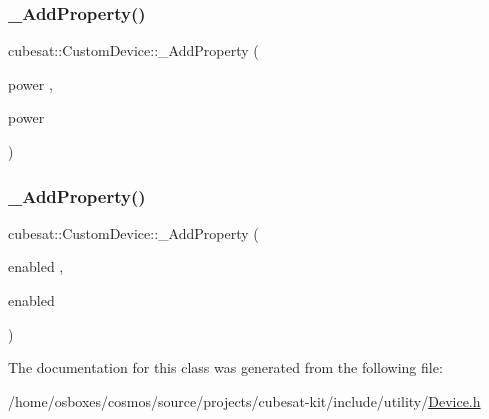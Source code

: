 \mbox{\label{classcubesat_1_1CustomDevice_a08d07a6fd08acc7064301ea4d9f927a3}} 
\subsubsection{\texorpdfstring{\+\_\+\+Add\+Property()}{\_AddProperty()}\hspace{0.1cm}{\footnotesize\ttfamily [5/6]}}
{\footnotesize\ttfamily cubesat\+::\+Custom\+Device\+::\+\_\+\+Add\+Property (\begin{DoxyParamCaption}\item[{power}]{,  }\item[{power}]{ }\end{DoxyParamCaption})}

\mbox{\label{classcubesat_1_1CustomDevice_adde28cab76c394ba807623d328bca1b1}} 
\subsubsection{\texorpdfstring{\+\_\+\+Add\+Property()}{\_AddProperty()}\hspace{0.1cm}{\footnotesize\ttfamily [6/6]}}
{\footnotesize\ttfamily cubesat\+::\+Custom\+Device\+::\+\_\+\+Add\+Property (\begin{DoxyParamCaption}\item[{enabled}]{,  }\item[{enabled}]{ }\end{DoxyParamCaption})}



The documentation for this class was generated from the following file\+:\begin{DoxyCompactItemize}
\item 
/home/osboxes/cosmos/source/projects/cubesat-\/kit/include/utility/\hyperlink{Device_8h}{Device.\+h}\end{DoxyCompactItemize}
